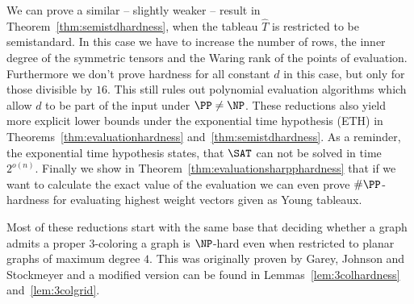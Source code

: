 We can prove a similar -- slightly weaker -- result in Theorem~\ref{thm:semistdhardness}, when the tableau $\hat{T}$ is restricted to be semistandard.
In this case we have to increase the number of rows, the inner degree of the symmetric tensors and the Waring rank of the points of evaluation.
Furthermore we don't prove hardness for all constant $d$ in this case, but only for those divisible by $16$.
This still rules out polynomial evaluation algorithms which allow $d$ to be part of the input under $\PP \neq \NP$.
These reductions also yield more explicit lower bounds under the exponential time hypothesis (ETH) in Theorems~\ref{thm:evaluationhardness} and~\ref{thm:semistdhardness}.
As a reminder, the exponential time hypothesis states, that $\SAT$ can not be solved in time $2^{o(n)}$.
Finally we show in Theorem~\ref{thm:evaluationsharpphardness} that if we want to calculate the exact value of the evaluation we can even prove $\#\PP$-hardness for evaluating highest weight vectors given as Young tableaux.

Most of these reductions start with the same base that deciding whether a graph admits a proper $3$-coloring a graph is $\NP$-hard even when restricted to planar graphs of maximum degree $4$.
This was originally proven by Garey, Johnson and Stockmeyer \cite{DBLP:journals/tcs/GareyJS76} and a modified version can be found in Lemmas~\ref{lem:3colhardness} and~\ref{lem:3colgrid}.


